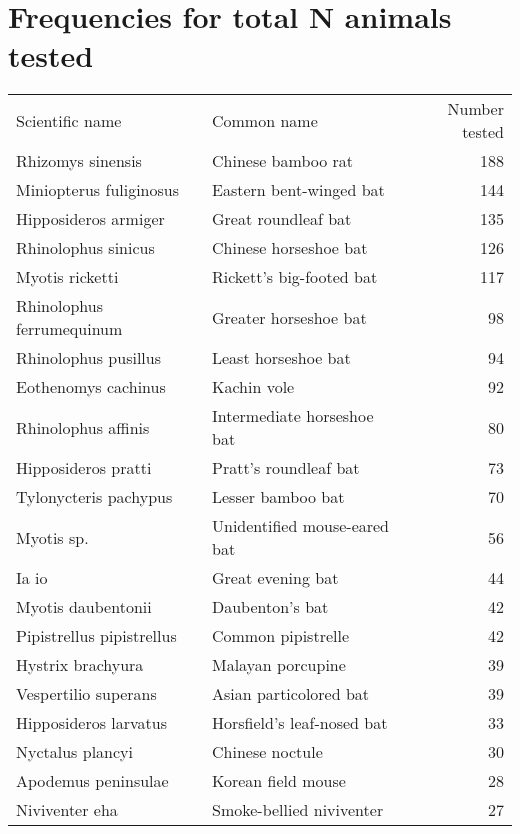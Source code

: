 \documentclass[11pt,article,oneside]{article}
\begin{document}
\section{Frequencies for total N animals
tested}\label{frequencies-for-total-n-animals-tested}

\begin{longtable}[c]{@{}llr@{}}
\toprule\addlinespace
Scientific name & Common name & Number tested
\\\addlinespace
\midrule\endhead
Rhizomys sinensis & Chinese bamboo rat & 188
\\\addlinespace
Miniopterus fuliginosus & Eastern bent-winged bat & 144
\\\addlinespace
Hipposideros armiger & Great roundleaf bat & 135
\\\addlinespace
Rhinolophus sinicus & Chinese horseshoe bat & 126
\\\addlinespace
Myotis ricketti & Rickett's big-footed bat & 117
\\\addlinespace
Rhinolophus ferrumequinum & Greater horseshoe bat & 98
\\\addlinespace
Rhinolophus pusillus & Least horseshoe bat & 94
\\\addlinespace
Eothenomys cachinus & Kachin vole & 92
\\\addlinespace
Rhinolophus affinis & Intermediate horseshoe bat & 80
\\\addlinespace
Hipposideros pratti & Pratt's roundleaf bat & 73
\\\addlinespace
Tylonycteris pachypus & Lesser bamboo bat & 70
\\\addlinespace
Myotis sp. & Unidentified mouse-eared bat & 56
\\\addlinespace
Ia io & Great evening bat & 44
\\\addlinespace
Myotis daubentonii & Daubenton's bat & 42
\\\addlinespace
Pipistrellus pipistrellus & Common pipistrelle & 42
\\\addlinespace
Hystrix brachyura & Malayan porcupine & 39
\\\addlinespace
Vespertilio superans & Asian particolored bat & 39
\\\addlinespace
Hipposideros larvatus & Horsfield's leaf-nosed bat & 33
\\\addlinespace
Nyctalus plancyi & Chinese noctule & 30
\\\addlinespace
Apodemus peninsulae & Korean field mouse & 28
\\\addlinespace
Niviventer eha & Smoke-bellied niviventer & 27

\end{longtable}
\end{document}
